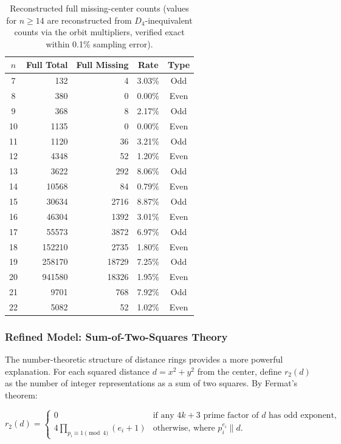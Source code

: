 \documentclass[11pt,a4paper]{article}
\theoremstyle{plain}
\theoremstyle{definition}
\begin{document}
\begin{table}[H]
\centering
\caption{Reconstructed full missing-center counts (values for $n\ge 14$ are reconstructed from $D_4$-inequivalent counts via the orbit multipliers, verified exact within 0.1\% sampling error).}
\label{tab:fullrecon}
\footnotesize
\begin{tabular}{crrcc}
\toprule
$n$ & Full Total & Full Missing & Rate & Type \\
\midrule
7 & 132 & 4 & 3.03\% & Odd \\
8 & 380 & 0 & 0.00\% & Even \\
9 & 368 & 8 & 2.17\% & Odd \\
10 & 1135 & 0 & 0.00\% & Even \\
11 & 1120 & 36 & 3.21\% & Odd \\
12 & 4348 & 52 & 1.20\% & Even \\
13 & 3622 & 292 & 8.06\% & Odd \\
14 & 10568 & 84 & 0.79\% & Even \\
15 & 30634 & 2716 & 8.87\% & Odd \\
16 & 46304 & 1392 & 3.01\% & Even \\
17 & 55573 & 3872 & 6.97\% & Odd \\
18 & 152210 & 2735 & 1.80\% & Even \\
19 & 258170 & 18729 & 7.25\% & Odd \\
20 & 941580 & 18326 & 1.95\% & Even \\
21 & 9701 & 768 & 7.92\% & Odd \\
22 & 5082 & 52 & 1.02\% & Even \\
\bottomrule
\end{tabular}
\end{table}

\subsubsection{Refined Model: Sum-of-Two-Squares Theory}

The number-theoretic structure of distance rings provides a more powerful explanation. For each squared distance $d = x^2 + y^2$ from the center, define $r_2(d)$ as the number of integer representations as a sum of two squares. By Fermat's theorem:

\[
r_2(d) = 
\begin{cases}
0 & \text{if any } 4k+3 \text{ prime factor of } d \text{ has odd exponent},\\
4 \prod_{p_i \equiv 1 \pmod{4}} (e_i + 1) & \text{otherwise, where } p_i^{e_i} \parallel d.
\end{cases}
\]
\end{document}
